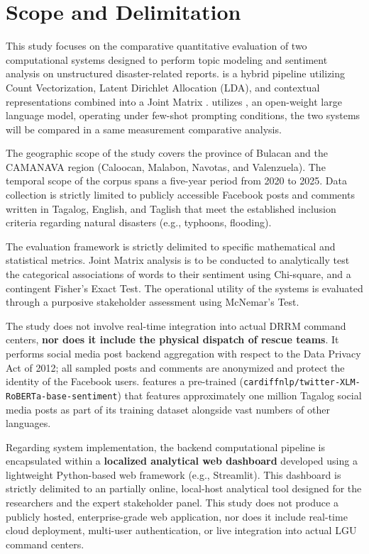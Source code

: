 \section*{Scope and Delimitation}

This study focuses on the comparative quantitative evaluation of two
computational systems designed to perform topic modeling and sentiment analysis on
unstructured disaster-related reports. \sysA{} is a hybrid pipeline utilizing
Count Vectorization, Latent Dirichlet Allocation (LDA), and \xlmr{}
contextual representations combined into a Joint Matrix 
. \sysB{} utilizes \qwen, an
open-weight large language model, operating under few-shot prompting
conditions, the two systems will be compared in a same measurement comparative analysis.

The geographic scope of the study covers the province of Bulacan and the
CAMANAVA region (Caloocan, Malabon, Navotas, and Valenzuela). The temporal
scope of the corpus spans a five-year period from 2020 to 2025. Data collection
is strictly limited to publicly accessible Facebook posts and comments written
in Tagalog, English, and Taglish that meet the established inclusion criteria
regarding natural disasters (e.g., typhoons, flooding).

The evaluation framework is strictly delimited to specific mathematical and
statistical metrics. Joint Matrix analysis is to be
conducted to analytically test the categorical associations of words to their
sentiment using Chi-square, and a contingent Fisher's Exact Test. The operational
utility of the systems is evaluated through a purposive stakeholder assessment using McNemar's Test.

The study does not involve real-time integration into actual DRRM command
centers, \textbf{nor does it include the physical dispatch of rescue teams}. It performs
social media post backend aggregation with respect to the Data Privacy Act of
2012; all sampled posts and comments are anonymized and protect the identity
of the Facebook users. \sysA{} features a pre-trained \xlmr{}
(\texttt{cardiffnlp/twitter-XLM-RoBERTa-base-sentiment}) that features
approximately one million Tagalog social media posts as part of its training
dataset alongside vast numbers of other languages.

Regarding system implementation, the backend computational pipeline is 
encapsulated within a \textbf{localized analytical web dashboard} developed 
using a lightweight Python-based web framework (e.g., Streamlit). This 
dashboard is strictly delimited to an partially online, local-host analytical tool
designed for the researchers and the expert stakeholder panel. This study does not produce a publicly hosted,
enterprise-grade web application, nor does it include real-time cloud 
deployment, multi-user authentication, or live integration into actual 
LGU command centers.